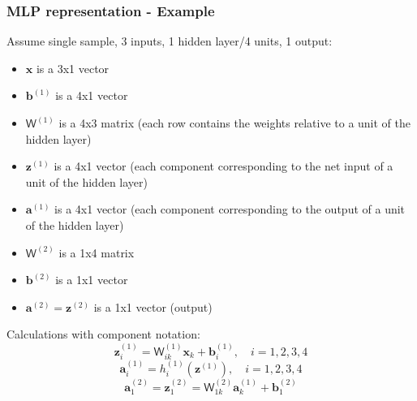 \documentclass{beamer}
\begin{document}
	\begin{frame}
		\frametitle{MLP representation - Example}
		Assume single sample, 3 inputs, 1 hidden layer/4 units, 1 output:
		\tiny{
		\begin{itemize}
			\item $\bm{x}$ is a 3x1 vector
			\item $\bm{b}^{(1)}$ is a 4x1 vector
			\item $\mathsf{W}^{(1)}$ is a 4x3 matrix (each row contains the weights relative to a unit of the hidden layer)
			\item $\bm{z}^{(1)}$ is a 4x1 vector (each component corresponding to the net input of a unit of the hidden layer)
			\item $\bm{a}^{(1)}$ is a 4x1 vector (each component corresponding to the output of a unit of the hidden layer)
			\item $\mathsf{W}^{(2)}$ is a 1x4 matrix
			\item $\bm{b}^{(2)}$ is a 1x1 vector
			\item $\bm{a}^{(2)} = \bm{z}^{(2)}$ is a 1x1 vector (output)
		\end{itemize}}
	\normalsize
		Calculations with component notation:
		$$\bm{z}_i^{(1)} = \mathsf{W}_{ik}^{(1)}\bm{x}_k + \bm{b}^{(1)}_i, \quad i=1,2,3,4$$
		$$\bm{a}_i^{(1)} = h_i^{(1)}(\bm{z}^{(1)}), \quad i=1,2,3,4 $$
		$$\bm{a}_1^{(2)} = \bm{z}_1^{(2)} = \mathsf{W}_{1k}^{(2)}\bm{a}^{(1)}_k + \bm{b}_1^{(2)}$$
	\end{frame}
	
\end{document}
